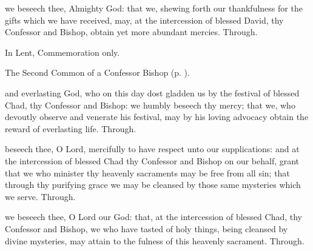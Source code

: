 \vspace{-0.5\baselineskip}

\postcommunion

\vspace{-0.16\baselineskip}

 we beseech thee, Almighty God: that we, shewing forth our thankfulness for the gifts which we have received, may, at the intercession of blessed David, thy Confessor and Bishop, obtain yet more abundant mercies. Through.



\begin{rubric}
	In Lent, Commemoration only.
\end{rubric}

\begin{rubric}
	The Second Common of a Confessor Bishop (p. \pageref{CommonConfessorBishopII}).
\end{rubric}

\vspace{-0.4\baselineskip}

\collect

\vspace{-0.1\baselineskip}

 and everlasting God, who on this day dost gladden us by the festival of blessed Chad, thy Confessor and Bishop: we humbly beseech thy mercy; that we, who devoutly observe and venerate his festival, may by his loving advocacy obtain the reward of everlasting life. Through.

\vspace{-0.4\baselineskip}

\secret

\vspace{-0.1\baselineskip}

 beseech thee, O Lord, mercifully to have respect unto our supplications: and at the intercession of blessed Chad thy Confessor and Bishop on our behalf, grant that we who minister thy heavenly sacraments may be free from all sin; that through thy purifying grace we may be cleansed by those same mysteries which we serve. Through.

\postcommunion
{} we beseech thee, O Lord our God: that, at the intercession of blessed Chad, thy Confessor and Bishop, we who have tasted of holy things, being cleansed by divine mysteries, may attain to the fulness of this heavenly sacrament. Through.


